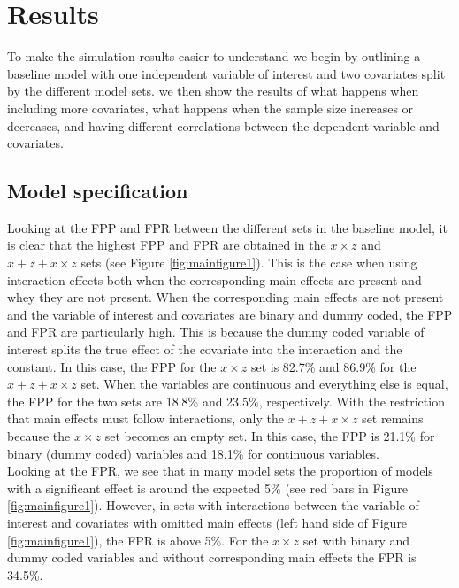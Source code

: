 \section{Results} 
To make the simulation results easier to understand we begin by outlining a baseline model with one independent variable of interest and two covariates split by the different model sets. we then show the results of what happens when including more covariates, what happens when the sample size increases or decreases, and having different correlations between the dependent variable and covariates. 

\subsection{Model specification}
Looking at the FPP and FPR between the different sets in the baseline model, it is clear that the highest FPP and FPR are obtained in the $x \times z$ and $x + z+ x \times z$ sets (see Figure \ref{fig:mainfigure1}). This is the case when using interaction effects both when the corresponding main effects are present and whey they are not present. When the corresponding main effects are not present and the variable of interest and covariates are binary and dummy coded, the FPP and FPR are particularly high. This is because the dummy coded variable of interest splits the true effect of the covariate into the interaction and the constant. In this case, the FPP for the $x \times z$ set is 82.7\% and 86.9\% for the $x + z+ x \times z$ set. When the variables are continuous and everything else is equal, the FPP for the two sets are 18.8\% and 23.5\%, respectively. With the restriction that main effects must follow interactions, only the $x + z+ x \times z$ set remains because the $x \times z$ set becomes an empty set. In this case, the FPP is 21.1\% for binary (dummy coded) variables and 18.1\% for continuous variables. \\ 
Looking at the FPR, we see that in many model sets the proportion of models with a significant effect is around the expected 5\%  (see red bars in Figure \ref{fig:mainfigure1}). However, in sets with interactions between the variable of interest and covariates with omitted main effects (left hand side of Figure \ref{fig:mainfigure1}), the FPR is above 5\%. For the $x \times z$ set with binary and dummy coded variables and without corresponding main effects the FPR is 34.5\%.
 \\

